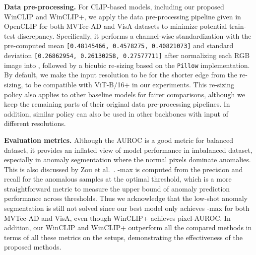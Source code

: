 \vspace{0.05in}
\noindent\textbf{Data pre-processing. }
For CLIP-based models, including our proposed WinCLIP and WinCLIP+, we apply the data pre-processing pipeline given in OpenCLIP \cite{ilharco_gabriel_2021_5143773} for both MVTec-AD and VisA datasets to minimize potential train-test discrepancy. Specifically, it performs a channel-wise standardization with the pre-computed mean \texttt{[0.48145466, 0.4578275, 0.40821073]} and standard deviation \texttt{[0.26862954, 0.26130258, 0.27577711]} after normalizing each RGB image into , followed by a bicubic re-sizing based on the \verb|Pillow| implementation. By default, we make the input resolution to be  for the shorter edge from the re-sizing, to be compatible with ViT-B/16+ in our experiments. This re-sizing policy also applies to other baseline models for fairer comparisons, although we keep the remaining parts of their original data pre-processing pipelines. In addition, similar policy can also be used in other backbones with input of different resolutions.

\vspace{0.05in}
\noindent\textbf{Evaluation metrics. }
Although the AUROC is a good metric for balanced dataset, it provides an inflated view of model performance in imbalanced dataset, especially in anomaly segmentation where the normal pixels dominate anomalies. This is also discussed by Zou et al.~\cite{zou2022spot}. -max is computed from the precision and recall for the anomalous samples at the optimal threshold, which is a more straightforward metric to measure the upper bound of anomaly prediction performance across thresholds. Thus we acknowledge that the low-shot anomaly segmentation is still not solved since our best model only achieves  -max for both MVTec-AD and VisA, even though WinCLIP+ achieves  pixel-AUROC. In addition, our WinCLIP and WinCLIP+ outperform all the compared methods in terms of all these metrics on the setups, demonstrating the effectiveness of the proposed methods.

